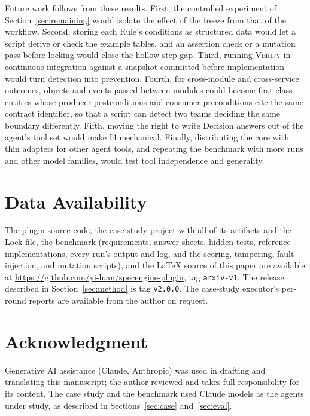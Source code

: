 \documentclass[conference]{IEEEtran}
\newcommand{\code}[1]{\texttt{#1}}
\begin{document}
Future work follows from these results. First, the controlled experiment of Section~\ref{sec:remaining} would isolate the effect of the freeze from that of the workflow. Second, storing each Rule's conditions as structured data would let a script derive or check the example tables, and an assertion check or a mutation pass before locking would close the hollow-step gap. Third, running \textsc{Verify} in continuous integration against a snapshot committed before implementation would turn detection into prevention. Fourth, for cross-module and cross-service outcomes, objects and events passed between modules could become first-class entities whose producer postconditions and consumer preconditions cite the same contract identifier, so that a script can detect two teams deciding the same boundary differently. Fifth, moving the right to write Decision answers out of the agent's tool set would make I4 mechanical. Finally, distributing the core with thin adapters for other agent tools, and repeating the benchmark with more runs and other model families, would test tool independence and generality.

\section*{Data Availability}

The plugin source code, the case-study project with all of its artifacts and the Lock file, the benchmark (requirements, answer sheets, hidden tests, reference implementations, every run's output and log, and the scoring, tampering, fault-injection, and mutation scripts), and the \LaTeX{} source of this paper are available at \url{https://github.com/yi-luan/specengine-plugin}, tag \code{arxiv-v1}. The release described in Section~\ref{sec:method} is tag \code{v2.0.0}. The case-study executor's per-round reports are available from the author on request.

\section*{Acknowledgment}

Generative AI assistance (Claude, Anthropic) was used in drafting and translating this manuscript; the author reviewed and takes full responsibility for its content. The case study and the benchmark used Claude models as the agents under study, as described in Sections~\ref{sec:case} and~\ref{sec:eval}.
\end{document}
